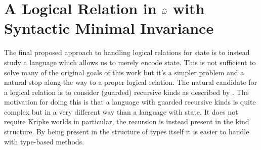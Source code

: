 \section{A Logical Relation in $\widehat{\omega}$ with Syntactic Minimal Invariance}\label{sec:guarded}

The final proposed approach to handling logical relations for state is
to instead study a language which allows us to merely encode
state. This is not sufficient to solve many of the original goals of
this work but it's a simpler problem and a natural stop along the way
to a proper logical relation. The natural candidate for a logical
relation is to consider (guarded) recursive kinds as described by
\citet{TODO-FORK}. The motivation for doing this is that a language
with guarded recursive kinds is quite complex but in a very different
way than a language with state. It does not require Kripke worlds in
particular, the recursion is instead present in the kind structure. By
being present in the structure of types itself it is easier to handle
with type-based methods.

